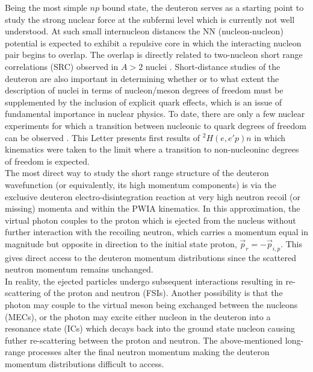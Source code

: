 Being the most simple $np$ bound state, the deuteron serves as a starting point to study the strong nuclear force at the subfermi level which is currently
not well understood. At such small internucleon distances the NN (nucleon-nucleon) potential is expected to exhibit a repulsive core in which the interacting
nucleon pair begins to overlap. The overlap is directly related to two-nucleon short range correlations (SRC) observed in $A>2$ nuclei \cite{PhysRevC.68.014313,PhysRevLett.96.082501,PhysRevLett.99.072501,Fomin_2017}. Short-distance studies
of the deuteron are also important in determining whether or to what extent the description of nuclei in terms of nucleon/meson degrees of freedom must be supplemented
by the inclusion of explicit quark effects, which is an issue of fundamental importance in nuclear physics\cite{pr01-020}. To date, there are only a few nuclear experiments for
which a transition between nucleonic to quark degrees of freedom can be observed \cite{PhysRevLett.81.4576,PhysRevLett.87.102302,PhysRevC.66.042201}. This Letter presents
first results of $^{2}H(e,e'p)n$ in which kinematics were taken to the limit where a transition to non-nucleoninc degrees of freedom is expected.\\
\indent The most direct way to study the short range structure of the deuteron wavefunction (or equivalently, its high momentum components) is via the exclusive deuteron
electro-disintegration reaction at very high neutron recoil (or missing) momenta and within the PWIA kinematics. In this approximation, the virtual photon couples to
the proton which is ejected from the nucleus without further interaction with the recoiling neutron, which carries a momentum equal in magnitude but opposite in direction
to the initial state proton, $\vec{p}_{r} = -\vec{p}_{i,p}$. This gives direct access to the deuteron momentum distributions since the scattered neutron momentum remains unchanged. \\
\indent In reality, the ejected particles undergo subsequent interactions resulting in re-scattering of the proton and neutron (FSIs). Another possibility is that the
photon may couple to the virtual meson being exchanged between the nucleons (MECs), or the photon may excite either nucleon in the deuteron into a resonance state (ICs) which
decays back into the ground state nucleon causing futher re-scattering between the proton and neutron. The above-mentioned long-range processes alter the final neutron
momentum making the deuteron momentum distributions difficult to access.\\
